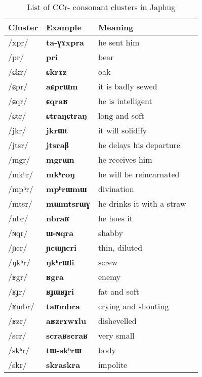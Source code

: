 \documentclass[oneside,a4paper,11pt]{article}
\newcommand{\ipa}[1]{{\phon\mbox{\textbf{#1}}}}
\newcommand{\deux}[1]{/#1/}
\newcommand{\trois}[1]{/#1/}
\newcommand{\tib}[1]{\cellcolor{lightgray}\textbf{#1}}
\newcommand{\idph}[1]{\cellcolor{gray}\textbf{#1}}
\begin{document}
  
\begin{table}[H]
\caption{List of CCr- consonant clusters in Japhug} \label{tab:CCr} \centering
\begin{tabular}{llll}
\toprule
Cluster &Example &Meaning \\
\midrule
  \trois{xpr}    	&   \ipa{ta-ɣɤxpra}    	&  he sent him  \\
 \deux{pr}   	&   \ipa{pri}   	&   bear \\
 \trois{ɕkr}    	&   \ipa{ɕkrɤz}    	&  oak  \\
 \trois{ɕpr}    	&   \ipa{aɕprɯm}    	&   it is badly sewed \\
 \trois{ɕqr}    	&   \ipa{ɕqraʁ}    	&   he is intelligent  \\
 \trois{ɕtr}  \idph{}  	&   \ipa{ɕtraŋɕtraŋ}    	&   long and soft \\
 \trois{jkr}    	&   \ipa{jkrɯt}    	&   it will solidify  \\
 \trois{jtsr}    	&   \ipa{jtsraβ}    	&  he delays his departure  \\
 \trois{mgr}    	&   \ipa{mgrɯn}    	&   he receives him \\
 \trois{mkʰr}    	&   \ipa{mkʰroŋ}    	&  he will be reincarnated  \\
 \trois{mpʰr}    	&   \ipa{mpʰrɯmɯ}    	&   divination \\
 \trois{mtsr}    	&   \ipa{mɯmtsrɯɣ}    	&  he drinks it with a straw  \\
 \trois{nbr}    	&   \ipa{nbraʁ}    	&  he hoes it  \\
 \trois{ɴqr}    	&   \ipa{ɯ-ɴqra}    	&   shabby \\
 \trois{ɲcr} \idph{}   	&   \ipa{ɲcɯɲcri}    	&  thin, diluted  \\
 \trois{ŋkʰr}    	&   \ipa{ŋkʰrɯli}    	&  screw  \\
 \trois{ʁgr} \tib{}    	&   \ipa{ʁgra}    	&   enemy \\
 \trois{ʁɟr}  \idph{}  	&   \ipa{ʁɟɯʁɟri}    	&   fat and soft \\
 \trois{ʁmbr}    	&   \ipa{taʁmbra}    	&   crying and shouting \\
 \trois{ʁzr}    	&   \ipa{aʁzrɤwɤlu}    	&   dishevelled \\
 \trois{scr}  \idph{}  	&   \ipa{scraʁscraʁ}    	&   very small \\
 \trois{skʰr}    	&   \ipa{tɯ-skʰrɯ}    	&   body  \\
 \trois{skr}    	&   \ipa{skraskra}    	&   impolite  \\

\end{tabular}
\end{table}
\end{document}
